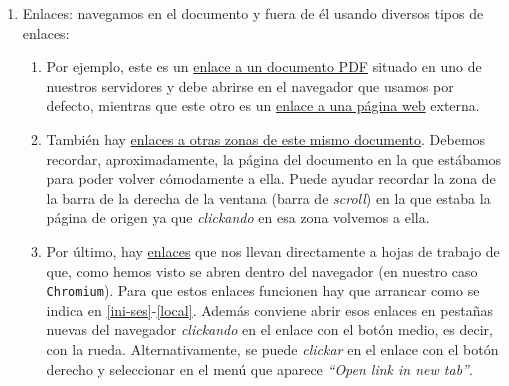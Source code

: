 \begin{appendices}
\begin{enumerate}


\item {\sc Enlaces:} navegamos en el documento y fuera de \'el usando diversos tipos de enlaces:
\begin{enumerate}
\item Por ejemplo, este es un \href{http://150.244.21.37/PDFs/INTRO/ltxprimer-1.0.pdf}{enlace a
un documento PDF} situado 
en uno de nuestros servidores y  debe abrirse en el navegador que usamos por defecto, mientras que este otro es un 
\href{http://www.sagemath.org/}{enlace a una p\'agina web} externa.



\item Tambi\'en hay \hyperref[prologo]{enlaces a otras zonas de este mismo documento}. Debemos  recordar, aproximadamente, la p\'agina del documento en la que est\'abamos para poder volver c\'omodamente a ella. Puede ayudar recordar la zona de la barra de la derecha de la ventana (barra de {\itshape scroll}) en la que estaba la p\'agina de origen ya que {\itshape clickando} en esa zona volvemos a ella. 






\item \label{enlaces-s} Por \'ultimo, hay \href{http://localhost:8888/notebooks/INTRO/Interaccion-con-SO.ipynb}{enlaces} que nos llevan directamente a hojas de trabajo de {\sage} que, como hemos visto se abren dentro del navegador (en nuestro caso
\verb|Chromium|). Para que estos enlaces funcionen hay que arrancar {\sage} como se indica en \ref{ini-ses}-\ref{local}. Adem\'as conviene abrir esos enlaces en pesta\~nas nuevas del navegador {\itshape clickando} en el enlace con el bot\'on medio, es decir, con la rueda.  Alternativamente, se puede {\itshape clickar} en el enlace con el bot\'on derecho y seleccionar en el men\'u que aparece {\itshape ``Open link in new tab''}.


\end{enumerate}





\end{enumerate}
\end{appendices}
